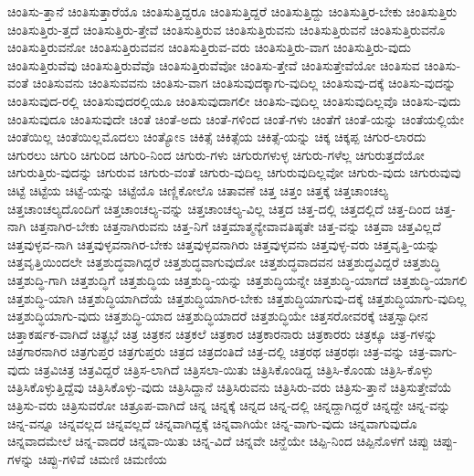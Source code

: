 {ಚಿಂತಿಸು-ತ್ತಾನೆ
ಚಿಂತಿಸುತ್ತಾರೆಯೊ
ಚಿಂತಿಸುತ್ತಿದ್ದರೂ
ಚಿಂತಿಸುತ್ತಿದ್ದರೆ
ಚಿಂತಿಸುತ್ತಿದ್ದು
ಚಿಂತಿಸುತ್ತಿರ-ಬೇಕು
ಚಿಂತಿಸುತ್ತಿರು
ಚಿಂತಿಸುತ್ತಿರು-ತ್ತದೆ
ಚಿಂತಿಸುತ್ತಿರು-ತ್ತೇವೆ
ಚಿಂತಿಸುತ್ತಿರುವ
ಚಿಂತಿಸುತ್ತಿರುವನು
ಚಿಂತಿಸುತ್ತಿರುವನೆ
ಚಿಂತಿಸುತ್ತಿರುವನೊ
ಚಿಂತಿಸುತ್ತಿರುವನೋ
ಚಿಂತಿಸುತ್ತಿರುವವನ
ಚಿಂತಿಸುತ್ತಿರುವ-ವರು
ಚಿಂತಿಸುತ್ತಿರು-ವಾಗ
ಚಿಂತಿಸುತ್ತಿರು-ವುದು
ಚಿಂತಿಸುತ್ತಿರುವೆವು
ಚಿಂತಿಸುತ್ತಿರುವೆವೊ
ಚಿಂತಿಸುತ್ತಿರುವೆವೋ
ಚಿಂತಿಸು-ತ್ತೇವೆ
ಚಿಂತಿಸುತ್ತೇವೆಯೋ
ಚಿಂತಿಸುವ
ಚಿಂತಿಸು-ವಂತೆ
ಚಿಂತಿಸುವನು
ಚಿಂತಿಸುವವನು
ಚಿಂತಿಸು-ವಾಗ
ಚಿಂತಿಸುವುದಕ್ಕಾಗು-ವುದಿಲ್ಲ
ಚಿಂತಿಸುವು-ದಕ್ಕೆ
ಚಿಂತಿಸು-ವುದನ್ನು
ಚಿಂತಿಸುವುದ-ರಲ್ಲಿ
ಚಿಂತಿಸುವುದರಲ್ಲಿಯೂ
ಚಿಂತಿಸುವುದಾಗಲೀ
ಚಿಂತಿಸು-ವುದಿಲ್ಲ
ಚಿಂತಿಸುವುದಿಲ್ಲವೊ
ಚಿಂತಿಸು-ವುದು
ಚಿಂತಿಸುವುದೂ
ಚಿಂತಿಸುವುದೇ
ಚಿಂತೆ
ಚಿಂತೆ-ಅದು
ಚಿಂತೆ-ಗಳಿಂದ
ಚಿಂತೆ-ಗಳು
ಚಿಂತೆಗೆ
ಚಿಂತೆ-ಯನ್ನು
ಚಿಂತೆಯಲ್ಲಿಯೇ
ಚಿಂತೆಯಿಲ್ಲ
ಚಿಂತೆಯಿಲ್ಲಮೊದಲು
ಚಿಂತ್ಯೋಽ
ಚಿಕಿತ್ಸೆ
ಚಿಕಿತ್ಸೆಯ
ಚಿಕಿತ್ಸೆ-ಯನ್ನು
ಚಿಕ್ಕ
ಚಿಕ್ಕಪ್ಪ
ಚಿಗುರ-ಲಾರದು
ಚಿಗುರಲು
ಚಿಗುರಿ
ಚಿಗುರಿದ
ಚಿಗುರಿ-ನಿಂದ
ಚಿಗುರು-ಗಳು
ಚಿಗುರುಗಳುಳ್ಳ
ಚಿಗುರು-ಗಳೆಲ್ಲ
ಚಿಗುರುತ್ತದೆಯೋ
ಚಿಗುರುತ್ತಿರು-ವುದನ್ನು
ಚಿಗುರುವ
ಚಿಗುರು-ವಂತೆ
ಚಿಗುರು-ವುದಿಲ್ಲ
ಚಿಗುರುವುದಿಲ್ಲವೋ
ಚಿಗುರು-ವುದು
ಚಿಗುರುವುವು
ಚಿಟ್ಟೆ
ಚಿಟ್ಟೆಯ
ಚಿಟ್ಟೆ-ಯನ್ನು
ಚಿಟ್ಟೆಯೊ
ಚಿಣ್ಣಿಕೋಲೊ
ಚಿತಾವಣೆ
ಚಿತ್ತ
ಚಿತ್ತಂ
ಚಿತ್ತಕ್ಕೆ
ಚಿತ್ತಚಾಂಚಲ್ಯ
ಚಿತ್ತಚಾಂಚಲ್ಯದೊಂದಿಗೆ
ಚಿತ್ತಚಾಂಚಲ್ಯ-ವನ್ನು
ಚಿತ್ತಚಾಂಚಲ್ಯ-ವಿಲ್ಲ
ಚಿತ್ತದ
ಚಿತ್ತ-ದಲ್ಲಿ
ಚಿತ್ತದಲ್ಲಿದೆ
ಚಿತ್ತ-ದಿಂದ
ಚಿತ್ತ-ನಾಗಿ
ಚಿತ್ತನಾಗಿರ-ಬೇಕು
ಚಿತ್ತನಾಗಿರುವನು
ಚಿತ್ತ-ನಿಗೆ
ಚಿತ್ತಮಾತ್ಮನ್ಯೇವಾವತಿಷ್ಠತೇ
ಚಿತ್ತ-ವನ್ನು
ಚಿತ್ತವಾ
ಚಿತ್ತವಿಲ್ಲದೆ
ಚಿತ್ತವುಳ್ಳವ-ನಾಗಿ
ಚಿತ್ತವುಳ್ಳವನಾಗಿರ-ಬೇಕು
ಚಿತ್ತವುಳ್ಳವನಾಗಿರು
ಚಿತ್ತವುಳ್ಳವನು
ಚಿತ್ತವುಳ್ಳ-ವರು
ಚಿತ್ತವೃತ್ತಿ-ಯನ್ನು
ಚಿತ್ತವೃತ್ತಿಯಿಂದಲೇ
ಚಿತ್ತಶುದ್ಧವಾಗಿದ್ದರೆ
ಚಿತ್ತಶುದ್ಧವಾಗುವುದೋ
ಚಿತ್ತಶುದ್ಧವಾದವನ
ಚಿತ್ತಶುದ್ಧವಿದ್ದರೆ
ಚಿತ್ತಶುದ್ಧಿ
ಚಿತ್ತಶುದ್ಧಿ-ಗಾಗಿ
ಚಿತ್ತಶುದ್ಧಿಗೆ
ಚಿತ್ತಶುದ್ಧಿಯ
ಚಿತ್ತಶುದ್ಧಿ-ಯನ್ನು
ಚಿತ್ತಶುದ್ಧಿಯನ್ನೇ
ಚಿತ್ತಶುದ್ಧಿ-ಯಾಗದೆ
ಚಿತ್ತಶುದ್ಧಿ-ಯಾಗಲಿ
ಚಿತ್ತಶುದ್ಧಿ-ಯಾಗಿ
ಚಿತ್ತಶುದ್ಧಿಯಾಗಿದೆಯೆ
ಚಿತ್ತಶುದ್ಧಿಯಾಗಿರ-ಬೇಕು
ಚಿತ್ತಶುದ್ಧಿಯಾಗುವು-ದಕ್ಕೆ
ಚಿತ್ತಶುದ್ಧಿಯಾಗು-ವುದಿಲ್ಲ
ಚಿತ್ತಶುದ್ಧಿಯಾಗು-ವುದು
ಚಿತ್ತಶುದ್ಧಿ-ಯಾದ
ಚಿತ್ತಶುದ್ಧಿಯಾದರೆ
ಚಿತ್ತಶುದ್ಧಿಯೇ
ಚಿತ್ತಸರೋವರಕ್ಕೆ
ಚಿತ್ತಸ್ವಾಧೀನ
ಚಿತ್ತಾಕರ್ಷಕ-ವಾಗಿದೆ
ಚಿತ್ಪ್ರಭೆ
ಚಿತ್ರ
ಚಿತ್ರಕನ
ಚಿತ್ರಕಲೆ
ಚಿತ್ರಕಾರ
ಚಿತ್ರಕಾರನಾರು
ಚಿತ್ರಕಾರರು
ಚಿತ್ರಕ್ಕೂ
ಚಿತ್ರ-ಗಳನ್ನು
ಚಿತ್ರಗಾರನಾಗಿರ
ಚಿತ್ರಗುಪ್ತರ
ಚಿತ್ರಗುಪ್ತರು
ಚಿತ್ರದ
ಚಿತ್ರದಂತಿದೆ
ಚಿತ್ರ-ದಲ್ಲಿ
ಚಿತ್ರರಥ
ಚಿತ್ರರಥಃ
ಚಿತ್ರ-ವನ್ನು
ಚಿತ್ರ-ವಾಗು-ವುದು
ಚಿತ್ರವಿಚಿತ್ರ
ಚಿತ್ರವಿದ್ದರೆ
ಚಿತ್ರಿಸ-ಲಾಗಿದೆ
ಚಿತ್ರಿಸಲಾ-ಯಿತು
ಚಿತ್ರಿಸಿಕೊಂಡಿದ್ದ
ಚಿತ್ರಿಸಿ-ಕೊಂಡು
ಚಿತ್ರಿಸಿ-ಕೊಳ್ಳು
ಚಿತ್ರಿಸಿಕೊಳ್ಳುತ್ತಿದ್ದೆವು
ಚಿತ್ರಿಸಿಕೊಳ್ಳು-ವುದು
ಚಿತ್ರಿಸಿದ್ದಾನೆ
ಚಿತ್ರಿಸಿರುವನು
ಚಿತ್ರಿಸಿರು-ವರು
ಚಿತ್ರಿಸು-ತ್ತಾನೆ
ಚಿತ್ರಿಸುತ್ತೇವೆಯೆ
ಚಿತ್ರಿಸು-ವರು
ಚಿತ್ರಿಸುವರೋ
ಚಿತ್ರೂಪ-ವಾಗಿದೆ
ಚಿನ್ನ
ಚಿನ್ನಕ್ಕೆ
ಚಿನ್ನದ
ಚಿನ್ನ-ದಲ್ಲಿ
ಚಿನ್ನದ್ದಾಗಿದ್ದರೆ
ಚಿನ್ನದ್ದೇ
ಚಿನ್ನ-ವನ್ನು
ಚಿನ್ನ-ವನ್ನೂ
ಚಿನ್ನವಲ್ಲದ
ಚಿನ್ನವಲ್ಲದೆ
ಚಿನ್ನವಾಗಿದ್ದಕ್ಕೆ
ಚಿನ್ನವಾಗಿಯೇ
ಚಿನ್ನ-ವಾಗು-ವುದು
ಚಿನ್ನವಾಗುವುದೊ
ಚಿನ್ನವಾದಮೇಲೆ
ಚಿನ್ನ-ವಾದರೆ
ಚಿನ್ನವಾ-ಯಿತು
ಚಿನ್ನ-ವಿದೆ
ಚಿನ್ನವೇ
ಚಿನ್ಹೆಯೇ
ಚಿಪ್ಪಿ-ನಿಂದ
ಚಿಪ್ಪಿನೊಳಗೆ
ಚಿಪ್ಪು
ಚಿಪ್ಪು-ಗಳನ್ನು
ಚಿಪ್ಪು-ಗಳಿವೆ
ಚಿಮಣಿ
ಚಿಮಣಿಯ
}
